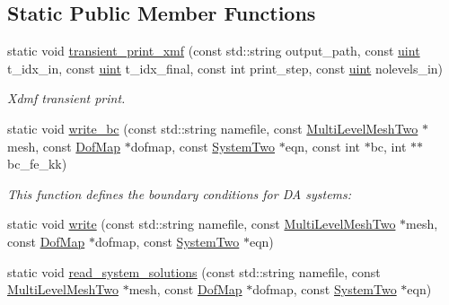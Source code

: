 \subsection*{Static Public Member Functions}
\begin{DoxyCompactItemize}
\item 
static void \mbox{\hyperlink{classfemus_1_1_x_d_m_f_writer_a574cd8744ab63d171e6928636caf6179}{transient\+\_\+print\+\_\+xmf}} (const std\+::string output\+\_\+path, const \mbox{\hyperlink{_typedefs_8hpp_a91ad9478d81a7aaf2593e8d9c3d06a14}{uint}} t\+\_\+idx\+\_\+in, const \mbox{\hyperlink{_typedefs_8hpp_a91ad9478d81a7aaf2593e8d9c3d06a14}{uint}} t\+\_\+idx\+\_\+final, const int print\+\_\+step, const \mbox{\hyperlink{_typedefs_8hpp_a91ad9478d81a7aaf2593e8d9c3d06a14}{uint}} nolevels\+\_\+in)
\begin{DoxyCompactList}\small\item\em Xdmf transient print. \end{DoxyCompactList}\item 
static void \mbox{\hyperlink{classfemus_1_1_x_d_m_f_writer_a6330529e2c5cef355c4a11bad0c382d2}{write\+\_\+bc}} (const std\+::string namefile, const \mbox{\hyperlink{classfemus_1_1_multi_level_mesh_two}{Multi\+Level\+Mesh\+Two}} $\ast$mesh, const \mbox{\hyperlink{classfemus_1_1_dof_map}{Dof\+Map}} $\ast$dofmap, const \mbox{\hyperlink{classfemus_1_1_system_two}{System\+Two}} $\ast$eqn, const int $\ast$bc, int $\ast$$\ast$bc\+\_\+fe\+\_\+kk)
\begin{DoxyCompactList}\small\item\em This function defines the boundary conditions for DA systems\+: \end{DoxyCompactList}\item 
static void \mbox{\hyperlink{classfemus_1_1_x_d_m_f_writer_af3d21c6aafbff12f1c9673b7a02b729f}{write}} (const std\+::string namefile, const \mbox{\hyperlink{classfemus_1_1_multi_level_mesh_two}{Multi\+Level\+Mesh\+Two}} $\ast$mesh, const \mbox{\hyperlink{classfemus_1_1_dof_map}{Dof\+Map}} $\ast$dofmap, const \mbox{\hyperlink{classfemus_1_1_system_two}{System\+Two}} $\ast$eqn)
\item 
static void \mbox{\hyperlink{classfemus_1_1_x_d_m_f_writer_a95803eb8ed73952254f58a4736675288}{read\+\_\+system\+\_\+solutions}} (const std\+::string namefile, const \mbox{\hyperlink{classfemus_1_1_multi_level_mesh_two}{Multi\+Level\+Mesh\+Two}} $\ast$mesh, const \mbox{\hyperlink{classfemus_1_1_dof_map}{Dof\+Map}} $\ast$dofmap, const \mbox{\hyperlink{classfemus_1_1_system_two}{System\+Two}} $\ast$eqn)
$$
\end{DoxyCompactItemize}
